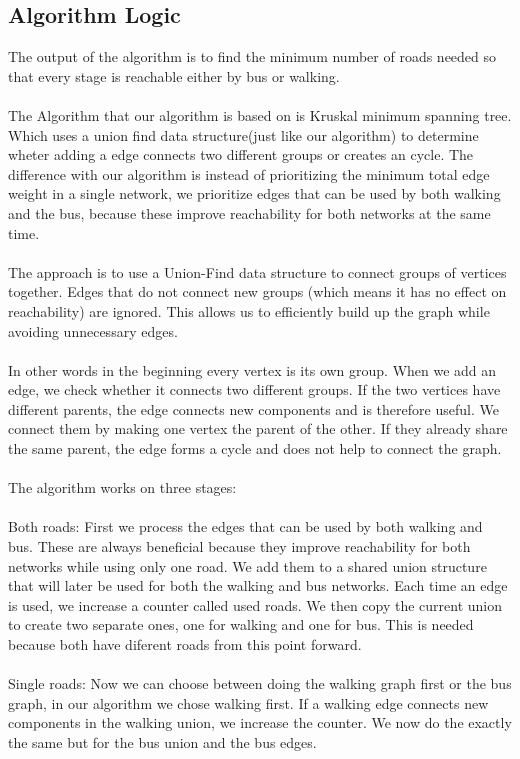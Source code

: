 \documentclass[a4paper]{article}
\begin{document}
\subsection{Algorithm Logic}
The output of the algorithm is to find the minimum number of roads needed so that every stage is reachable either by bus or walking.
\\
\\
The Algorithm that our algorithm is based on is Kruskal minimum spanning tree. Which uses a union find data structure(just like our algorithm) to determine wheter adding a edge connects two different groups or creates an cycle. The difference with our algorithm is instead of prioritizing the minimum total edge weight in a single network, we prioritize edges that can be used by both walking and the bus, because these improve reachability for both networks at the same time.
\\
\\
The approach is to use a Union-Find data structure to connect groups of vertices together.
Edges that do not connect new groups (which means it has no effect on reachability) are ignored.
This allows us to efficiently build up the graph while avoiding unnecessary edges.
\\
\\
In other words in the beginning every vertex is its own group.
When we add an edge, we check whether it connects two different groups.
If the two vertices have different parents, the edge connects new components and is therefore useful. We connect them by making one vertex the parent of the other.
If they already share the same parent, the edge forms a cycle and does not help to connect the graph.
\\
\\
The algorithm works on three stages:
\\
\\
Both roads:
First we process the edges that can be used by both walking and bus.
These are always beneficial because they improve reachability for both networks while using only one road.
We add them to a shared union structure that will later be used for both the walking and bus networks.
Each time an edge is used, we increase a counter called used roads.
We then copy the current union to create two separate ones, one for walking and one for bus.
This is needed because both have diferent roads from this point forward.
\\
\\
Single roads:
Now we can choose between doing the walking graph first or the bus graph, in our algorithm we chose walking first.
If a walking edge connects new components in the walking union, we increase the counter.
We now do the exactly the same but for the bus union and the bus edges.
\end{document}
